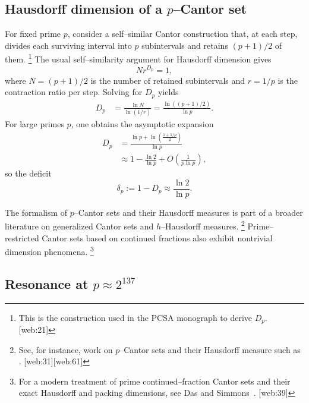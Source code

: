 \documentclass[11pt]{article}
\begin{document}
\subsection{Hausdorff dimension of a $p$--Cantor set}

For fixed prime $p$, consider a self--similar Cantor construction that, at each step, divides each surviving interval into $p$ subintervals and retains $(p+1)/2$ of them.%
\footnote{This is the construction used in the PCSA monograph to derive $D_p$. [web:21]} 
The usual self--similarity argument for Hausdorff dimension gives
\[
  N r^{D_p} = 1,
\]
where $N = (p+1)/2$ is the number of retained subintervals and $r = 1/p$ is the contraction ratio per step. Solving for $D_p$ yields
\begin{align}
  D_p 
    &= \frac{\ln N}{\ln(1/r)} 
     = \frac{\ln((p+1)/2)}{\ln p}. \label{eq:Dp}
\end{align}
For large primes $p$, one obtains the asymptotic expansion
\begin{align}
  D_p 
    &= \frac{\ln p + \ln\left(\frac{1 + 1/p}{2}\right)}{\ln p} \\
    &\approx 1 - \frac{\ln 2}{\ln p} + O\!\left(\frac{1}{p \ln p}\right),
\end{align}
so the deficit
\begin{equation}
  \delta_p := 1 - D_p \approx \frac{\ln 2}{\ln p}.
\end{equation}

The formalism of $p$--Cantor sets and their Hausdorff measures is part of a broader literature on generalized Cantor sets and $h$--Hausdorff measures.%
\footnote{See, for instance, work on $p$--Cantor sets and their Hausdorff measure such as \cite{hausdorff_pcantor}. [web:31][web:61]} 
Prime--restricted Cantor sets based on continued fractions also exhibit nontrivial dimension phenomena.%
\footnote{For a modern treatment of prime continued--fraction Cantor sets and their exact Hausdorff and packing dimensions, see Das and Simmons~\cite{das_simmons_prime_cantor}. [web:39]} 

\subsection{Resonance at $p \approx 2^{137}$}
\end{document}
